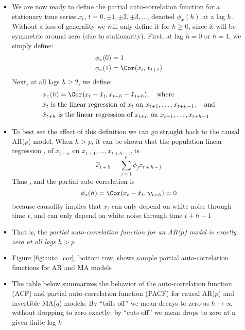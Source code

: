 \documentclass{article}
\begin{document}
\begin{itemize}
\item We are now ready to define the partial auto-correlation function for a
  stationary time series $x_t$, $t = 0, \pm 1, \pm 2, \pm 3, \dots$, denoted
  $\phi_x(h)$ at a lag $h$. Without a loss of generality we will only define it
  for $h \geq 0$, since it will be symmetric around zero (due to stationarity). 
  First, at lag $h=0$ or $h=1$, we simply define: 
  \begin{align*}
  \phi_x(0) &= 1 \\
  \phi_x(1) &= \Cor(x_t, x_{t+1}) 
  \end{align*}
  Next, at all lags $h \geq 2$, we define: 
  \begin{align*}
  &\phi_x(h) = \Cor(x_t - \hat{x}_t, x_{t+h} - \hat{x}_{t+h}), \quad
    \text{where} \\ 
  &\text{$\hat{x}_t$ is the linear regression of $x_t$ on
    $x_{t+1},\dots,x_{t+h-1}$}, \quad \text{and} \\ 
  &\text{$\hat{x}_{t+h}$ is the linear regression of $x_{t+h}$ on 
    $x_{t+1},\dots,x_{t+h-1}$}  
  \end{align*}

\item To best see the effect of this definition we can go straight back to the
  causal AR($p$) model. When $h>p$, it can be shown that the population linear 
  regression , of $x_{t+h}$ on $x_{t+1},\dots,x_{t+h-1}$, 
  is 
  \[
  \hat{x}_{t+h} = \sum_{j=1}^p \phi_j x_{t+h-j}
  \]
  Thus , and the partial auto-correlation is
  \[
  \phi_x(h) = \Cor(x_t - \hat{x}_t, w_{t+h}) = 0
  \]
  because causality implies that $x_t$ can only depend on white noise through
  time $t$, and  can only depend on white noise through time
  $t+h-1$ 

\item That is, the \emph{partial auto-correlation function for an AR($p$) model
  is exactly zero at all lags $h > p$}

\item Figure \ref{fig:auto_cor}, bottom row, shows sample partial
  auto-correlation functions for AR and MA models

\item The table below summarizes the behavior of the auto-correlation function
  (ACF) and partial auto-correlation function (PACF) for causal AR($p$) and
  invertible MA($q$) models. By ``tails off'' we mean decays to zero as $h \to
  \infty$ without dropping to zero exactly; by ``cuts off'' we mean drops to
  zero at a given finite lag $h$


\end{itemize}
\end{document}
